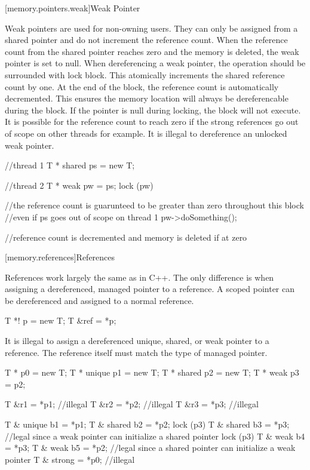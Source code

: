 [memory.pointers.weak]{Weak Pointer}

Weak pointers are used for non-owning users. They can only be assigned from a shared pointer and do not increment the reference count. When the reference count from the shared pointer reaches zero and the memory is deleted, the weak pointer is set to null. When dereferencing a weak pointer, the operation should be surrounded with lock block. This atomically increments the shared reference count by one. At the end of the block, the reference count is automatically decremented. This ensures the memory location will always be dereferencable during the block. If the pointer is null during locking, the block will not execute. It is possible for the reference count to reach zero if the strong references go out of scope on other threads for example. It is illegal to dereference an unlocked weak pointer.

\begin{codeblock}

//thread 1
T * shared ps = new T;


//thread 2
T * weak pw = ps;
lock (pw)	
{
	//the reference count is guarunteed to be greater than zero throughout this block
	//even if ps goes out of scope on thread 1
	pw->doSomething();
	
} //reference count is decremented and memory is deleted if at zero


\end{codeblock}




[memory.references]{References}

References work largely the same as in C++. The only difference is when assigning a dereferenced, managed pointer to a reference. A scoped pointer can be dereferenced and assigned to a normal reference.

\begin{codeblock}

T *! p = new T;
T &ref = *p;

\end{codeblock}

It is illegal to assign a dereferenced unique, shared, or weak pointer to a reference. The reference itself must match the type of managed pointer.

\begin{codeblock}

T * p0 = new T;
T * unique p1 = new T;
T * shared p2 = new T;
T * weak p3 = p2;

T &r1 = *p1; //illegal
T &r2 = *p2; //illegal
T &r3 = *p3; //illegal

T & unique b1 = *p1;
T & shared b2 = *p2;
lock (p3) { T & shared b3 = *p3; } //legal since a weak pointer can initialize a shared pointer
lock (p3) { T & weak b4 = *p3; }
T & weak b5 = *p2; //legal since a shared pointer can initialize a weak pointer
T & strong = *p0; //illegal

\end{codeblock}

